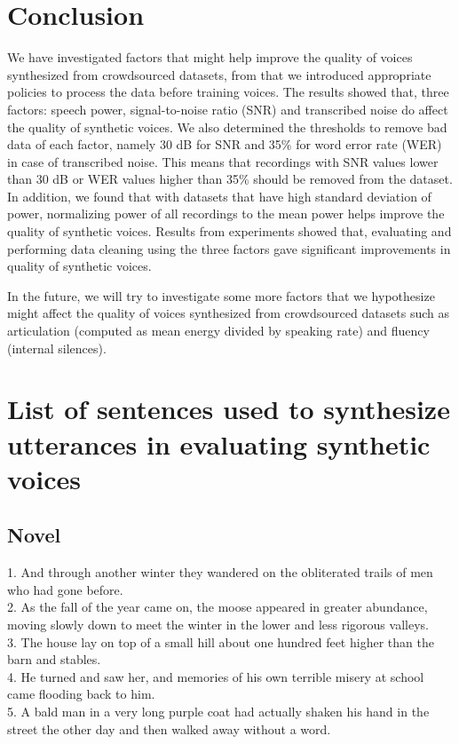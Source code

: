 \documentclass[12pt]{article}
\begin{document}
\newpage
\section{Conclusion}\label{sec_conclusion}
We have investigated factors that might help improve the quality of voices synthesized from crowdsourced datasets, from that we introduced appropriate policies to process the data before training voices. The results showed that, three factors: speech power, signal-to-noise ratio (SNR) and transcribed noise do affect the quality of synthetic voices. We also determined the thresholds to remove bad data of each factor, namely 30 dB for SNR and 35\% for word error rate (WER) in case of transcribed noise. This means that recordings with SNR values lower than 30 dB or WER values higher than 35\% should be removed from the dataset. In addition, we found that with datasets that have high standard deviation of power, normalizing power of all recordings to the mean power helps improve the quality of synthetic voices. Results from experiments showed that, evaluating and performing data cleaning using the three factors gave significant improvements in quality of synthetic voices.

In the future, we will try to investigate some more factors that we hypothesize might affect the quality of voices synthesized from crowdsourced datasets such as articulation (computed as mean energy divided by speaking rate) and fluency (internal silences).

\clearpage
\appendix
\setcounter{secnumdepth}{0}
\section{List of sentences used to synthesize utterances in evaluating synthetic voices}\label{sec_appendix}

\subsection{Novel}
1.	And through another winter they wandered on the obliterated trails of men who had gone before.\\
2.	As the fall of the year came on, the moose appeared in greater abundance, moving slowly down to meet the winter in the lower and less rigorous valleys.\\
3.	The house lay on top of a small hill about one hundred feet higher than the barn and stables.\\
4.	He turned and saw her, and memories of his own terrible misery at school came flooding back to him.\\
5.	A bald man in a very long purple coat had actually shaken his hand in the street the other day and then walked away without a word.
\end{document}
